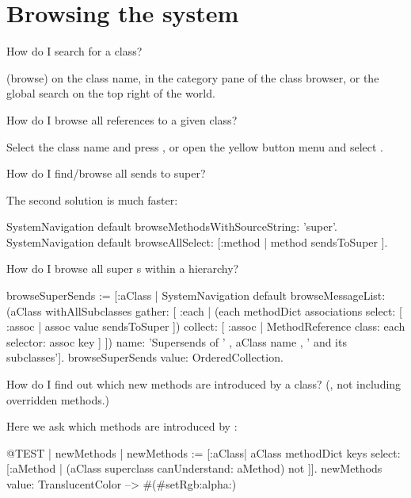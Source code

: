 \documentclass[a4paper,10pt,twoside]{book}
\begin{document}
\section{Browsing the system}

\begin{faq}
How do I search for a class?
\end{faq}
\answer
{} (browse) on the class name,  in the category pane of the class browser, or the global search on the top right of the world.

\begin{faq}
How do I browse all references to a given class?
\end{faq}
\answer
Select the class name and press , or open the yellow button menu and select .

\begin{faq}
How do I find/browse all sends to super?
\end{faq}
\answer
The second solution is much faster:
\begin{code}{}
SystemNavigation default browseMethodsWithSourceString: 'super'.
SystemNavigation default browseAllSelect: [:method | method sendsToSuper ].
\end{code}

\begin{faq}
How do I browse all super s within a hierarchy?
\end{faq}
\answer
\begin{code}{}
browseSuperSends := [:aClass | SystemNavigation default
	browseMessageList: (aClass withAllSubclasses gather: [ :each |
		(each methodDict associations
			select: [ :assoc | assoc value sendsToSuper ])
				collect: [ :assoc | MethodReference class: each selector: assoc key ] ])
	name: 'Supersends of ' , aClass name , ' and its subclasses'].
browseSuperSends value: OrderedCollection.
\end{code}

\begin{faq}
How do I find out which new methods are introduced by a class?
(\ie, not including overridden methods.)
\end{faq}
\answer
Here we ask which methods are introduced by :
\begin{code}{@TEST | newMethods |}
newMethods := [:aClass| aClass methodDict keys select:
	[:aMethod | (aClass superclass canUnderstand: aMethod) not ]].
newMethods value: TranslucentColor --> #(#setRgb:alpha:)
\end{code}
\end{document}
